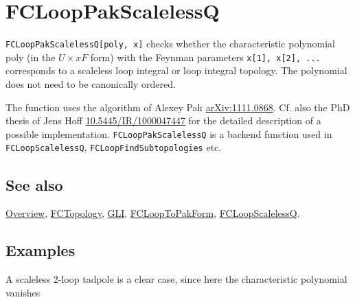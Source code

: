 \documentclass[../FeynCalcManual.tex]{subfiles}
\begin{document}
\hypertarget{fclooppakscalelessq}{
\section{FCLoopPakScalelessQ}\label{fclooppakscalelessq}}

\texttt{FCLoopPakScalelessQ[\allowbreak{}poly,\ \allowbreak{}x]} checks
whether the characteristic polynomial poly (in the \(U \times xF\) form)
with the Feynman parameters
\texttt{x[\allowbreak{}1],\ \allowbreak{}x[\allowbreak{}2],\ \allowbreak{}...}
corresponds to a scaleless loop integral or loop integral topology. The
polynomial does not need to be canonically ordered.

The function uses the algorithm of Alexey Pak
\href{https://arxiv.org/abs/1111.0868}{arXiv:1111.0868}. Cf. also the
PhD thesis of Jens Hoff
\href{https://doi.org/10.5445/IR/1000047447}{10.5445/IR/1000047447} for
the detailed description of a possible implementation.
\texttt{FCLoopPakScalelessQ} is a backend function used in
\texttt{FCLoopScalelessQ}, \texttt{FCLoopFindSubtopologies} etc.

\subsection{See also}

\hyperlink{toc}{Overview}, \hyperlink{fctopology}{FCTopology},
\hyperlink{gli}{GLI}, \hyperlink{fclooptopakform}{FCLoopToPakForm},
\hyperlink{fcloopscalelessq}{FCLoopScalelessQ}.

\subsection{Examples}

A scaleless 2-loop tadpole is a clear case, since here the
characteristic polynomial vanishes

\begin{Shaded}
\begin{Highlighting}[]
\ExtensionTok{=}\OperatorTok{[}\OperatorTok{,}\OperatorTok{,}\SpecialCharTok{{-}}\OperatorTok{]} 
 
\ExtensionTok{=}\OperatorTok{[}\OperatorTok{,} \OperatorTok{\{}\OperatorTok{,}\OperatorTok{\},}  \OtherTok{{-}\textgreater{}} \OperatorTok{,} 
     
      \OtherTok{{-}\textgreater{}} \OperatorTok{[\{}\OperatorTok{,} \OperatorTok{\},}  \OperatorTok{]][[}\OperatorTok{]][[}\OperatorTok{]]}
\end{Highlighting}
\end{Shaded}
\end{document}
